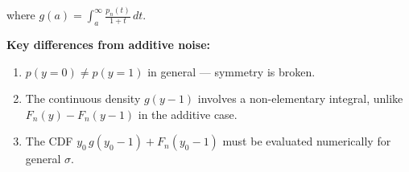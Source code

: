 where $g(a) = \displaystyle\int_a^{\infty} \frac{p_n(t)}{1+t}\,dt$.

\textbf{Key differences from additive noise:}
\begin{enumerate}
  \item $p(y=0) \neq p(y=1)$ in general — symmetry is broken.
  \item The continuous density $g(y-1)$ involves a non-elementary integral,
        unlike $F_n(y) - F_n(y-1)$ in the additive case.
  \item The CDF $y_0\,g(y_0-1) + F_n(y_0-1)$ must be evaluated numerically
        for general $\sigma$.
\end{enumerate}